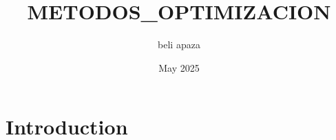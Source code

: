 \documentclass{article}
\title{METODOS_OPTIMIZACION}
\author{beli apaza}
\date{May 2025}
\begin{document}
\maketitle

\section{Introduction}
\end{document}
